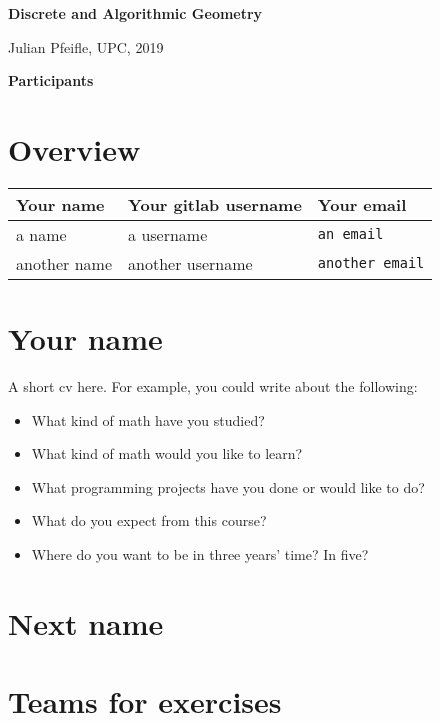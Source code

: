 \documentclass[11pt]{amsart}
\begin{document}
\begin{center}
\textbf{\sffamily
   Discrete and Algorithmic Geometry }

\medskip
   Julian Pfeifle,
   UPC, 2019
\end{center}

\bigskip

\begin{center}
  \textbf{\sffamily Participants}
\end{center}

\medskip

\section*{Overview}

\begin{center}
  \begin{tabular}[c]{lll}
    Your name
    & Your gitlab username
    & Your email
    \\\hline
    a name
    & a username
    & \texttt{an email}
    \\
    another name
    & another username
    & \texttt{another email}
  \end{tabular}
\end{center}

\section*{Your name}

A short cv here. For example, you could write about the following:

\begin{itemize}
\item What kind of math have you studied?
\item What kind of math would you like to learn?
\item What programming projects have you done or would like to do?
\item What do you expect from this course?
\item Where do you want to be in three years' time? In five?
\end{itemize}


\medskip

\section*{Next name}


\newpage
\section*{Teams for exercises}
\end{document}
